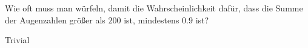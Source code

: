 \begin{exercise}

Wie oft muss man würfeln, damit die Wahrscheinlichkeit dafür, dass die Summe der Augenzahlen größer als $200$ ist, mindestens $0.9$ ist?

\end{exercise}

\begin{solution}

Trivial

\end{solution}
